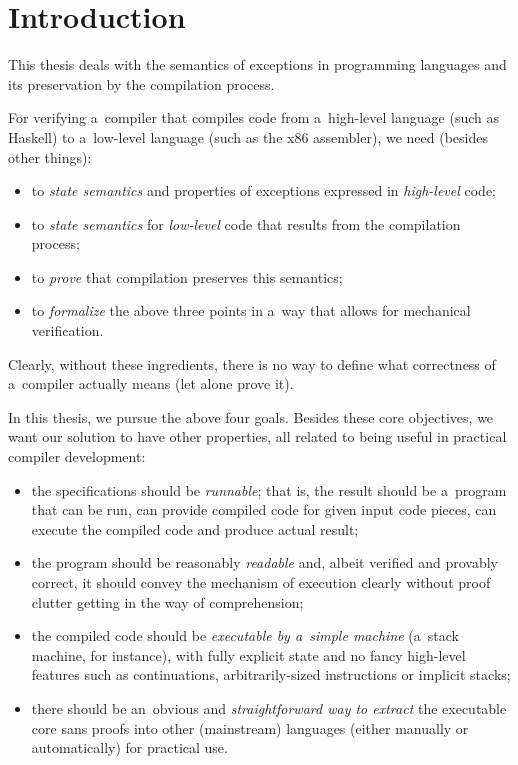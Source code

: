 \chapter*{Introduction}


This thesis deals with the semantics of exceptions in programming languages and its preservation
by the compilation process.

For verifying a~compiler that compiles code from a~high-level language (such as Haskell)
to a~low-level language (such as the x86 assembler), we need (besides other things):
\begin{itemize}
	\item to \emph{state semantics} and properties of exceptions expressed in \emph{high-level} code;
	\item to \emph{state semantics} for \emph{low-level} code that results from the compilation process;
	\item to \emph{prove} that compilation preserves this semantics;
	\item to \emph{formalize} the above three points in a~way that allows for mechanical verification.
\end{itemize}
Clearly, without these ingredients, there is no way to define what correctness of a~compiler actually
means (let alone prove it).

In this thesis, we pursue the above four goals.
Besides these core objectives, we want our solution to have other properties, all related
to being useful in practical compiler development:
\begin{itemize}\label{objectives}
	\item the specifications should be \emph{runnable}; that is, the result should be a~program
		that can be run, can provide compiled code for given input code pieces, can execute
		the compiled code and produce actual result;
	\item the program should be reasonably \emph{readable} and, albeit verified and provably
		correct, it should convey the mechanism of execution clearly without proof clutter getting
		in the way of comprehension;
	\item the compiled code should be \emph{executable by a~simple machine} (a~stack machine,
		for instance), with fully explicit state and no fancy high-level features such as
		continuations, arbitrarily-sized instructions or implicit stacks;
	\item there should be an~obvious and \emph{straightforward way to extract} the executable core
		sans proofs into other (mainstream) languages (either manually or automatically)
		for practical use.
\end{itemize}

